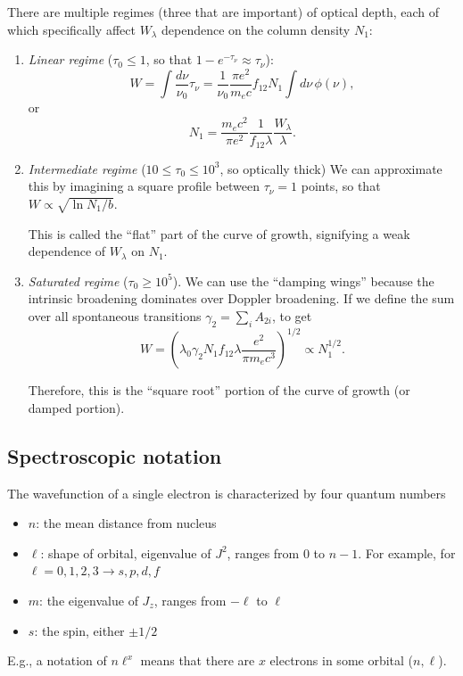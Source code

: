 \documentclass{tufte-handout}
\begin{document}
There are multiple regimes (three that are important) of optical depth, each of which specifically affect $W_\lambda$ dependence on the column density $N_1$:
\begin{enumerate}
\item \textit{Linear regime} ($\tau_0 \leq 1$, so that $1 - e^{-\tau_\nu} \approx \tau_\nu$):
\begin{equation}
W = \int \frac{d\nu}{\nu_0}\tau_\nu = \frac{1}{\nu_0} \frac{\pi e^2}{m_e c} f_{12} N_1 \int d\nu \, \phi(\nu),
\end{equation}
or
\begin{equation}
N_1 = \frac{m_e c^2}{\pi e^2}\frac{1}{f_{12} \lambda} \frac{W_\lambda}{\lambda}.
\end{equation}
\item \textit{Intermediate regime} ($10 \leq \tau_0 \leq 10^3$, so optically thick)
We can approximate this by imagining a square profile between $\tau_\nu =1$ points, so that $W \propto \sqrt{\ln N_1/b}$.

This is called the ``flat'' part of the curve of growth, signifying a weak dependence of $W_\lambda$ on $N_1$.

\item \textit{Saturated regime} ($\tau_0 \geq 10^5$). We can use the ``damping wings'' because the intrinsic broadening dominates over Doppler broadening. If we define the sum over all spontaneous transitions $\gamma_2 = \sum_i A_{2i}$, to get
\begin{equation}
W = \left (\lambda_0 \gamma_2 N_1 f_{12} \lambda \frac{e^2 }{\pi m_e c^3}\right )^{1/2} \propto N_1^{1/2}.
\end{equation}

Therefore, this is the ``square root'' portion of the curve of growth (or damped portion).
\end{enumerate}

\subsection{Spectroscopic notation}
The wavefunction of a single electron is characterized by four quantum numbers
\begin{itemize}
\item $n$: the mean distance from nucleus
\item $\ell$: shape of orbital, eigenvalue of $J^2$, ranges from 0 to $n-1$. 
For example, for $\ell = 0, 1, 2, 3 \rightarrow s, p, d, f$
\item $m$: the eigenvalue of $J_z$, ranges from $-\ell$ to $\ell$
\item $s$: the spin, either $\pm 1/2$
\end{itemize}
E.g., a notation of $n \ell^x$ means that there are $x$ electrons in some orbital ($n, \ell$).
\end{document}
